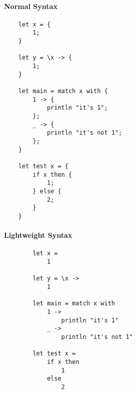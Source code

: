 \documentclass{report}
\begin{document}
\begin{paracol}{2}
    \paragraph{Normal Syntax}
    \begin{verbatim}
    let x = {
        1;
    }

    let y = \x -> {
        1;
    }
    
    let main = match x with {
        1 -> {
            println "it's 1";
        };
        _ -> {
            println "it's not 1";
        };
    }

    let test x = {
        if x then {
            1;
        } else {
            2;
        }
    }
    \end{verbatim}

    \switchcolumn{}
    \paragraph{Lightweight Syntax}
    \begin{verbatim}
        let x =
            1

        let y = \x ->
            1

        let main = match x with
            1 ->
                println "it's 1"
            _ ->
                println "it's not 1"

        let test x = 
            if x then 
                1
            else
                2
    \end{verbatim}
\end{paracol}
\end{document}
